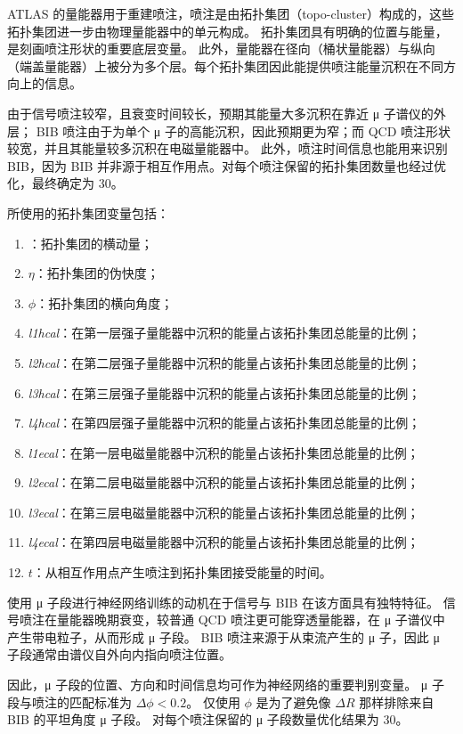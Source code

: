 ATLAS 的量能器用于重建喷注，喷注是由拓扑集团（topo-cluster）构成的，这些拓扑集团进一步由物理量能器中的单元构成。
拓扑集团具有明确的位置与能量，是刻画喷注形状的重要底层变量。
此外，量能器在径向（桶状量能器）与纵向（端盖量能器）上被分为多个层。每个拓扑集团因此能提供喷注能量沉积在不同方向上的信息。

由于信号喷注较窄，且衰变时间较长，预期其能量大多沉积在靠近 μ 子谱仪的外层；
BIB 喷注由于为单个 μ 子的高能沉积，因此预期更为窄；而 QCD 喷注形状较宽，并且其能量较多沉积在电磁量能器中。
此外，喷注时间信息也能用来识别 BIB，因为 BIB 并非源于相互作用点。对每个喷注保留的拓扑集团数量也经过优化，最终确定为 30。

所使用的拓扑集团变量包括：
\begin{enumerate}
      \item \pt：拓扑集团的横动量；
      \item $\eta$：拓扑集团的伪快度；
      \item $\phi$：拓扑集团的横向角度；
      \item \textit{l1hcal}：在第一层强子量能器中沉积的能量占该拓扑集团总能量的比例；
      \item \textit{l2hcal}：在第二层强子量能器中沉积的能量占该拓扑集团总能量的比例；
      \item \textit{l3hcal}：在第三层强子量能器中沉积的能量占该拓扑集团总能量的比例；
      \item \textit{l4hcal}：在第四层强子量能器中沉积的能量占该拓扑集团总能量的比例；
      \item \textit{l1ecal}：在第一层电磁量能器中沉积的能量占该拓扑集团总能量的比例；
      \item \textit{l2ecal}：在第二层电磁量能器中沉积的能量占该拓扑集团总能量的比例；
      \item \textit{l3ecal}：在第三层电磁量能器中沉积的能量占该拓扑集团总能量的比例；
      \item \textit{l4ecal}：在第四层电磁量能器中沉积的能量占该拓扑集团总能量的比例；
      \item $t$：从相互作用点产生喷注到拓扑集团接受能量的时间。
\end{enumerate}

使用 μ 子段进行神经网络训练的动机在于信号与 BIB 在该方面具有独特特征。
信号喷注在量能器晚期衰变，较普通 QCD 喷注更可能穿透量能器，在 μ 子谱仪中产生带电粒子，从而形成 μ 子段。
BIB 喷注来源于从束流产生的 μ 子，因此 μ 子段通常由谱仪自外向内指向喷注位置。

因此，μ 子段的位置、方向和时间信息均可作为神经网络的重要判别变量。
μ 子段与喷注的匹配标准为 $\Delta \phi < 0.2$。
仅使用 $\phi$ 是为了避免像 $\Delta R$ 那样排除来自 BIB 的平坦角度 μ 子段。
对每个喷注保留的 μ 子段数量优化结果为 30。


